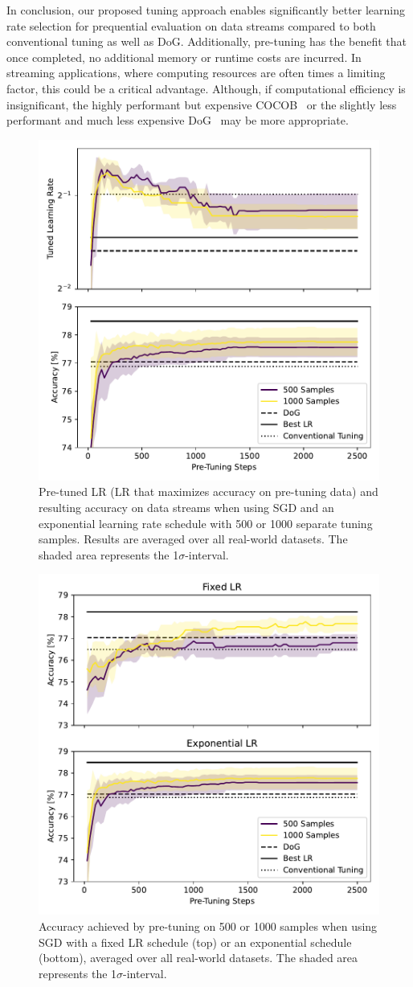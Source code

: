 \documentclass[letterpaper]{article} %
\begin{document}
In conclusion, our proposed tuning approach enables significantly better learning rate selection for prequential evaluation on data streams compared to both conventional tuning as well as DoG.
Additionally, pre-tuning has the benefit that once completed, no additional memory or runtime costs are incurred. 
In streaming applications, where computing resources are often times a limiting factor, this could be a critical advantage. 
Although, if computational efficiency is insignificant, the highly performant but expensive COCOB~\cite{orabonaTrainingDeepNetworks2017} or the slightly less performant and much less expensive DoG~\cite{ivgiDoGSGDBest2023} may be more appropriate. 


\begin{figure}[h]
	\centering
	\includegraphics[width=.45\textwidth]{figures/pretune_1x64_acc_lr_exp_schedule.pdf}
	\caption{Pre-tuned LR (LR that maximizes accuracy on pre-tuning data) and resulting accuracy on data streams when using SGD and an exponential learning rate schedule with 500 or 1000 separate tuning samples. Results are averaged over all real-world datasets. The shaded area represents the 1$\sigma$-interval.}\label{fig:pretune_lr_accuracy}
\end{figure}

\begin{figure}[h]
	\centering
	\includegraphics[width=.47\textwidth]{figures/pretune_1x64_fixed_vs_exp_schedule.pdf}
	\caption{Accuracy achieved by pre-tuning on 500 or 1000 samples when using SGD with a fixed LR schedule (top) or an exponential schedule (bottom), averaged over all real-world datasets. The shaded area represents the 1$\sigma$-interval.}\label{fig:pretune_fixed_vs_exp_lr}
\end{figure}
\end{document}
